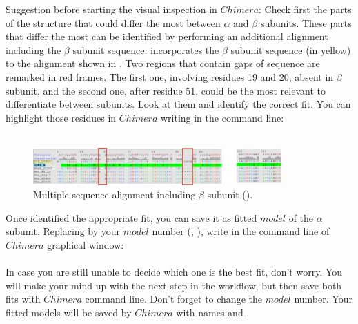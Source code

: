 \begin{itemize}
  Suggestion before starting the visual inspection in $Chimera$: Check first the parts of the structure that could differ the most between  $\alpha$ and $\beta$ subunits. These parts that differ the most can be identified by performing an additional alignment including the $\beta$ subunit sequence.  incorporates the $\beta$ subunit sequence (in yellow) to the alignment shown in . Two regions that contain gaps of sequence are remarked in red frames. The first one, involving residues 19 and 20, absent in $\beta$ subunit, and the second one, after residue 51, could be the most relevant to differentiate between subunits. Look at them and identify the correct fit. You can highlight those residues in $Chimera$ writing in the command line:\\
  \\
  
  \begin{figure}[H]
  \centering 
  \captionsetup{width=.7\linewidth} 
  \includegraphics[width=0.85\textwidth]{Images/Fig23}
  \caption{Multiple sequence alignment including  $\beta$ subunit ().}
  \label{fig:multiple_alignment_HBB}
  \end{figure}
  
  Once identified the appropriate fit, you can save it as fitted $model$ of the  $\alpha$ subunit. Replacing  by your $model$ number (, ), write in the command line of $Chimera$ graphical window:\\
  
  \\
  
In case you are still unable to decide which one is the best fit, don't worry. You will make your mind up with the next step in the workflow, but then save both fits with  $Chimera$ command line. Don't forget to change the $model$ number. Your fitted models will be saved by $Chimera$ with names  and .
 
\end{itemize}
